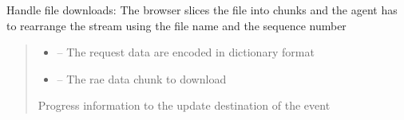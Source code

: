 \documentclass[letterpaper,10pt,english]{sphinxmanual}
\begin{document}
\begin{savenotes}
\begin{fulllineitems}
\begin{savenotes}
\begin{fulllineitems}
\begin{quote}
\begin{description}
\end{description}\end{quote}

\end{fulllineitems}\end{savenotes}


\begin{savenotes}\begin{fulllineitems}
\label{\detokenize{eezz:eezz.http_agent.THttpAgent.handle_download}}
\pysigstartsignatures
{}
\pysigstopsignatures
\sphinxAtStartPar
Handle file downloads: The browser slices the file into chunks and the agent has to
re\sphinxhyphen{}arrange the stream using the file name and the sequence number
\begin{quote}\begin{description}
\begin{itemize}
\item {} 
\sphinxAtStartPar
{} – The request data are encoded in dictionary format

\item {} 
\sphinxAtStartPar
{} – The rae data chunk to download

\end{itemize}

\sphinxAtStartPar
Progress information to the update destination of the event

\end{description}\end{quote}

\end{fulllineitems}\end{savenotes}



\end{fulllineitems}
\end{savenotes}
\end{document}
